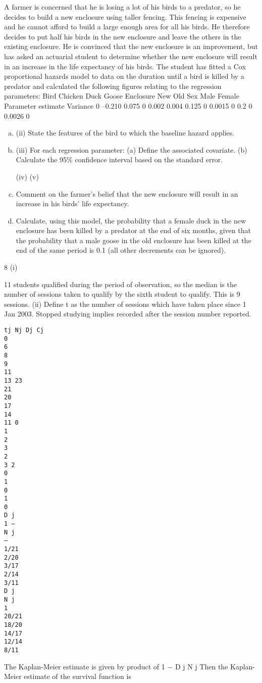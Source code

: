 \documentclass[a4paper,12pt]{article}
\begin{document}
\begin{enumerate}
A farmer is concerned that he is losing a lot of his birds to a predator, so he decides to build a new enclosure using taller fencing. This fencing is expensive and he cannot afford to build a large enough area for all his birds. He therefore decides to put half
his birds in the new enclosure and leave the others in the existing enclosure. He is convinced that the new enclosure is an improvement, but has asked an actuarial student to determine whether the new enclosure will result in an increase in the life
expectancy of his birds. The student has fitted a Cox proportional hazards model to
data on the duration until a bird is killed by a predator and calculated the following
figures relating to the regression parameters:
Bird Chicken
Duck
Goose
Enclosure New
Old
Sex Male
Female
Parameter estimate Variance
0
–0.210
0.075 0
0.002
0.004
0.125
0 0.0015
0
0.2
0 0.0026
0
\begin{enumerate}[(a)]
\item (ii) State the features of the bird to which the baseline hazard applies.
\item (iii) For each regression parameter:
(a) Define the associated covariate.
(b) Calculate the 95\% confidence interval based on the standard error.
 
 
(iv)
(v)
\item Comment on the farmer’s belief that the new enclosure will result in an increase in his birds’ life expectancy.
\item  
Calculate, using this model, the probability that a female duck in the new enclosure has been killed by a predator at the end of six months, given that the probability that a male goose in the old enclosure has been killed at the end of the same period is 0.1 (all other decrements can be ignored).
\end{enumerate}



8
(i)

11 students qualified during the period of observation, so the median is the number of sessions taken to qualify by the sixth student to qualify.
This is 9 sessions.
(ii)
Define t as the number of sessions which have taken place since 1 Jan 2003.
Stopped studying implies recorded after the session number reported.
\begin{verbatim}
tj Nj Dj Cj
0
6
8
9
11
13 23
21
20
17
14
11 0
1
2
3
2
3 2
0
1
0
1
0
D j
1 −
N j
–
1/21
2/20
3/17
2/14
3/11
D j
N j
1
20/21
18/20
14/17
12/14
8/11
\end{verbatim}
The Kaplan-Meier estimate is given by product of 1 −
D j
N j
Then the Kaplan-Meier estimate of the survival function is


\end{enumerate}
\end{document}
